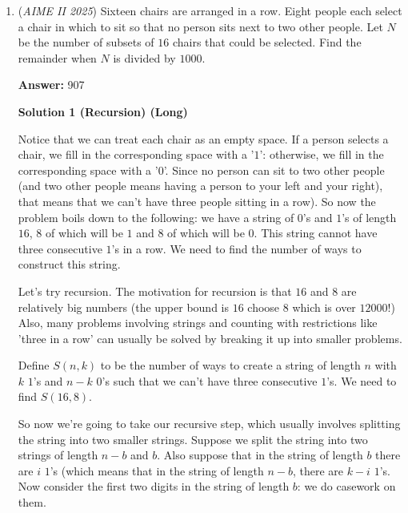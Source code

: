 \begin{enumerate}
 In the second case, we must have $\cos(7\pi\sin(5x))=0$. Substituting $\sin(5x)=\frac{k}{7}$ yields $\cos(k\pi)=0$. But this is impossible since $\cos(0)=1$ and $\cos(\pi)=-1$, so there are no points in this case.

 As a result, $t=10+0=10$, so $n+t=139+10=\boxed{149}$. 

 


	\item (\textit{AIME II 2025}) Sixteen chairs are arranged in a row. Eight people each select a chair in which to sit so that no person sits next to two other people. Let $N$ be the number of subsets of $16$ chairs that could be selected. Find the remainder when $N$ is divided by $1000$.


 
 \textbf{Answer: }907



\textbf{Solution 1 (Recursion) (Long)}

Notice that we can treat each chair as an empty space. If a person selects a chair, we fill in the corresponding space with a '$1$': otherwise, we fill in the corresponding space with a '$0$'. Since no person can sit to two other people (and two other people means having a person to your left and your right), that means that we can't have three people sitting in a row). So now the problem boils down to the following: we have a string of $0$'s and $1$'s of length $16$, $8$ of which will be $1$ and $8$ of which will be $0$. This string cannot have three consecutive $1$'s in a row. We need to find the number of ways to construct this string.

 Let's try recursion. The motivation for recursion is that $16$ and $8$ are relatively big numbers (the upper bound is $16$ choose $8$ which is over $12000$!) Also, many problems involving strings and counting with restrictions like 'three in a row' can usually be solved by breaking it up into smaller problems. 

 Define $S(n,k)$ to be the number of ways to create a string of length $n$ with $k$ $1$'s and $n-k$ $0$'s such that we can't have three consecutive $1$'s. We need to find $S(16,8)$. 

 So now we're going to take our recursive step, which usually involves splitting the string into two smaller strings. Suppose we split the string into two strings of length $n-b$ and $b$. Also suppose that in the string of length $b$ there are $i$ $1$'s (which means that in the string of length $n-b$, there are $k-i$ $1$'s. Now consider the first two digits in the string of length $b$: we do casework on them.


\end{enumerate}
